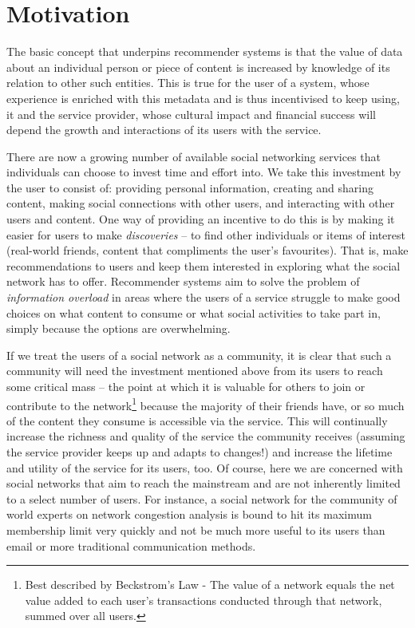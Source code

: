 \documentclass[a4paper,12pt,twoside,notitlepage]{report}
\begin{document}
\section{Motivation}

The basic concept that underpins recommender systems is that the value of data
about an individual person or piece of content is increased by knowledge of its
relation to other such entities. This is true for the user of a system, whose
experience is enriched with this metadata and is thus incentivised to keep
using, it and the service provider, whose cultural impact and financial success
will depend the growth and interactions of its users with the service.

There are now a growing number of available social networking services that
individuals can choose to invest time and effort into. We take this investment
by the user to consist of: providing personal information, creating and sharing
content, making social connections with other users, and interacting with other
users and content. One way of providing an incentive to do this is by making it
easier for users to make \emph{discoveries} -- to find other individuals or
items of interest (real-world friends, content that compliments the user's
favourites). That is, make recommendations to users and keep them interested in
exploring what the social network has to offer. Recommender systems aim
to solve the problem of \emph{information overload} in areas where the users of
a service struggle to make good choices on what content to consume or what
social activities to take part in, simply because the options are overwhelming.

If we treat the users of a social network as a community, it is clear that such
a community will need the investment mentioned above from its users to reach
some critical mass -- the point at which it is valuable for others to join 
or contribute to the network\footnote{Best described by Beckstrom's Law - The
value of a network equals the net value added to each user's transactions
conducted through that network, summed over all users.} because the majority of
their friends have, or so much of the content they consume is accessible via the
service. This will continually increase the richness and quality of the service
the community receives (assuming the service provider keeps up and adapts to
changes!) and increase the lifetime and utility of the service for its users,
too. Of course, here we are concerned with social networks that aim to reach the
mainstream and are not inherently limited to a select number of users. For
instance, a social network for the community of world experts on network
congestion analysis is bound to hit its maximum membership limit very quickly
and not be much more useful to its users than email or more traditional
communication methods.
\end{document}
